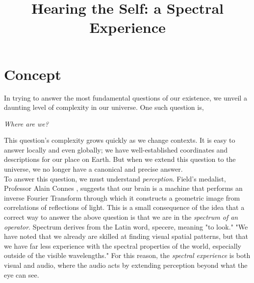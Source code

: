 \documentclass{article}
\title{Hearing the Self: a Spectral Experience}
\date{}
\begin{document}
 
\maketitle



\tableofcontents



\section{Concept}


In trying to answer the most fundamental questions of our existence, we unveil a daunting level of complexity in our universe. One such question is,\\

\begin{center}
\textit{Where are we?}
\end{center}

\noindent This question's complexity grows quickly as we change contexts. It is easy to answer locally and even globally; we have well-established coordinates and descriptions for our place on Earth. But when we extend this question to the universe, we no longer have a canonical and precise answer. \\

\noindent To answer this question, we must understand \textit{perception}. Field’s medalist, Professor Alain Connes \cite{connes}, suggests that our brain is a machine that performs an inverse Fourier Transform through which it constructs a geometric image from correlations of reflections of light. This is a small consequence of the idea that a correct way to answer the above question is that we are in the \textit{spectrum of an operator}. Spectrum derives from the Latin word, specere, meaning "to look." "We have noted that we already are skilled at finding visual spatial patterns, but that we have far less experience with the spectral properties of the world, especially outside of the visible wavelengths." For this reason, the \textit{spectral experience} is both visual and audio, where the audio acts by extending perception beyond what the eye can see.\\
\end{document}
